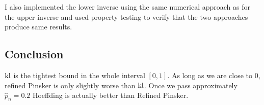 I also implemented the lower inverse using the same numerical approach as for the upper inverse and used property testing to verify that the two approaches produce same results.

\subsection*{Conclusion}
$\operatorname{kl}$ is the tightest bound in the whole interval $[0, 1]$. As long as we are close to $0$, refined Pinsker is only slightly worse than $\operatorname{kl}$. Once we pass approximately $\hat{p}_n=0.2$ Hoeffding is actually better than Refined Pinsker.